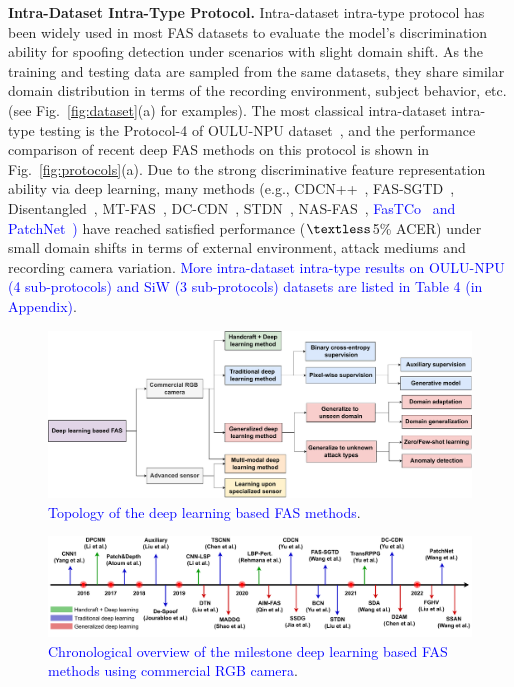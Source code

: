 \documentclass[10pt,journal,compsoc]{IEEEtran}
\begin{document}
\noindent\textbf{Intra-Dataset Intra-Type Protocol.}\quad 
Intra-dataset intra-type protocol has been widely used in most FAS datasets to evaluate the model's discrimination ability for spoofing detection under scenarios with slight domain shift. As the training and testing data are sampled from the same datasets, they share similar domain distribution in terms of the recording environment, subject behavior, etc. (see Fig.~\ref{fig:dataset}(a) for examples). The most classical intra-dataset intra-type testing is the Protocol-4 of OULU-NPU dataset~\cite{Boulkenafet2017OULU}, and the performance comparison of recent deep FAS methods on this protocol is shown in Fig.~\ref{fig:protocols}(a). Due to the strong discriminative feature representation ability via deep learning, many methods (e.g., CDCN++~\cite{yu2020searching}, FAS-SGTD~\cite{wang2020deep}, Disentangled~\cite{zhang2020face}, MT-FAS~\cite{qin2021meta}, DC-CDN~\cite{yu2021dual}, STDN~\cite{liu2020disentangling}, NAS-FAS~\cite{yu2020fas2}, \textcolor{blue}{FasTCo~\cite{xu2020improving} and PatchNet~\cite{wang2022patchnet})} have reached satisfied performance ($\textless$5\% ACER) under small domain shifts in terms of external environment, attack mediums and recording camera variation. \textcolor{blue}{More intra-dataset intra-type results on OULU-NPU (4 sub-protocols) and SiW (3 sub-protocols) datasets are listed in Table 4 (in Appendix)}.  



\begin{figure}
\centering
\includegraphics[scale=0.42]{Figures/topology.pdf}
  \caption{ 
  \textcolor{blue}{Topology of the deep learning based FAS methods}.
  }
\label{fig:topology}
\end{figure}


\begin{figure}
\centering
\includegraphics[scale=0.44]{Figures/milestone.pdf}
  \caption{ 
  \textcolor{blue}{Chronological overview of the milestone deep learning based FAS methods using commercial RGB camera}.
  }
\label{fig:milestone}
\end{figure}
\end{document}
